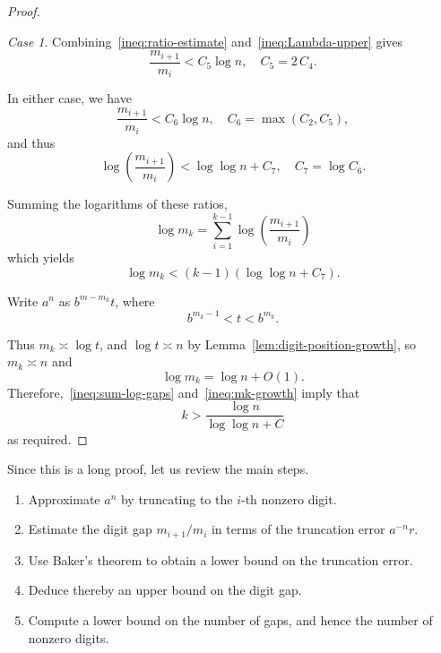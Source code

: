 \documentclass[12pt]{amsart}
\theoremstyle{remark}
\newtheorem{case}{Case}
\begin{document}
\begin{proof}
\begin{case}
    Combining~\eqref{ineq:ratio-estimate} and~\eqref{ineq:Lambda-upper} gives
    \[
        \frac{m_{i+1}}{m_{i}} < C_5 \log n, \quad C_5 = 2\,C_4.
    \]
    \end{case}

    In either case, we have
    \begin{equation}
        \label{ineq:gap-bound}
        \frac{m_{i+1}}{m_{i}} < C_6 \log n, \quad C_6 = \max(C_2, C_5),
    \end{equation}
    and thus
    \begin{equation}
        \label{ineq:gap-bound-log}
        \log\left(\frac{m_{i+1}}{m_i}\right) < \log \log n + C_7,
        \quad C_7 = \log C_6.
    \end{equation}

    Summing the logarithms of these ratios,
    \[
        \log m_k = \sum_{i=1}^{k-1} \log \left(\frac{m_{i+1}}{m_{i}}\right)
    \]
    which yields
    \begin{equation} \label{ineq:sum-log-gaps}
        \log m_k < (k - 1) (\log \log n + C_{7}).
    \end{equation}

    Write $a^n$ as $b^{m-m_k} t$, where
    \[
        b^{m_k-1} < t < b^{m_k}.
    \]

    Thus $m_k \asymp \log t$, and $\log t \asymp n$ by Lemma~\ref{lem:digit-position-growth},
    so $m_k \asymp n$ and
    \begin{equation} \label{ineq:mk-growth}
        \log m_k = \log n + O(1).
    \end{equation}
    Therefore,~\eqref{ineq:sum-log-gaps} and~\eqref{ineq:mk-growth} imply that
    \[
        k > \frac{\log n}{\log \log n + C}
    \]
    as required.
\end{proof}

Since this is a long proof, let us review the main steps.
\begin{enumerate}
    \item Approximate $a^n$ by truncating to the $i$-th nonzero digit.
    \item Estimate the digit gap $m_{i+1} / m_i$ in terms of the truncation error $a^{-n} r$.
    \item Use Baker's theorem to obtain a lower bound on the truncation error.
    \item Deduce thereby an upper bound on the digit gap.
    \item Compute a lower bound on the number of gaps, and hence the number of nonzero digits.
\end{enumerate}
\end{document}
